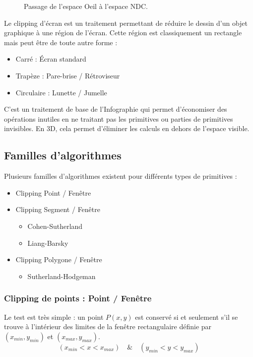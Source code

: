 \documentclass{article}
\begin{document}
\begin{figure}[H]
\centering
\caption{Passage de l'espace Oeil à l'espace NDC.}
\label{fig:ndc_transform}
\end{figure}

Le clipping d'écran est un traitement permettant de réduire le dessin d'un objet graphique à une région de l'écran. Cette région est classiquement un rectangle mais peut être de toute autre forme :
\begin{itemize}
    \item Carré : Écran standard
    \item Trapèze : Pare-brise / Rétroviseur
    \item Circulaire : Lunette / Jumelle
\end{itemize}
C'est un traitement de base de l'Infographie qui permet d'économiser des opérations inutiles en ne traitant pas les primitives ou parties de primitives invisibles. En 3D, cela permet d'éliminer les calculs en dehors de l'espace visible.

\subsection{Familles d'algorithmes}
Plusieurs familles d'algorithmes existent pour différents types de primitives :
\begin{itemize}
    \item Clipping Point / Fenêtre
    \item Clipping Segment / Fenêtre
    \begin{itemize}
        \item Cohen-Sutherland
        \item Liang-Barsky
    \end{itemize}
    \item Clipping Polygone / Fenêtre
    \begin{itemize}
        \item Sutherland-Hodgeman
    \end{itemize}
\end{itemize}

\subsubsection{Clipping de points : Point / Fenêtre}
Le test est très simple : un point $P(x, y)$ est conservé si et seulement s'il se trouve à l'intérieur des limites de la fenêtre rectangulaire définie par $(x_{min}, y_{min})$ et $(x_{max}, y_{max})$.
\[
(x_{min} < x < x_{max}) \quad \& \quad (y_{min} < y < y_{max})
\]
\end{document}
